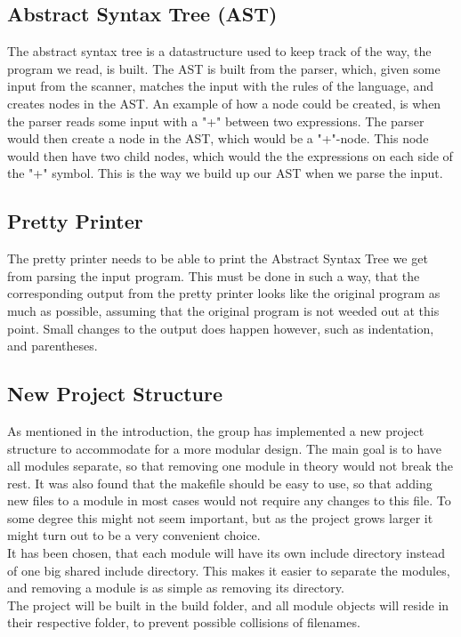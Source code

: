\documentclass[a4paper,10pt,titlepage]{report}
\begin{document}
\subsection{Abstract Syntax Tree (AST)}
The abstract syntax tree is a datastructure used to keep track of the way, the program we read, is built. The AST is built from the parser, which, given some input from the scanner, matches the input with the rules of the language, and creates nodes in the AST. An example of how a node could be created, is when the parser reads some input with a "+" between two expressions. The parser would then create a node in the AST, which would be a "+"-node. This node would then have two child nodes, which would the the expressions on each side of the "+" symbol. This is the way we build up our AST when we parse the input.

\subsection{Pretty Printer}
The pretty printer needs to be able to print the Abstract Syntax Tree we get from parsing the input program. This must be done in such a way, that the corresponding output from the pretty printer looks like the original program as much as possible, assuming that the original program is not weeded out at this point. Small changes to the output does happen however, such as indentation, and parentheses.

\subsection{New Project Structure}
As mentioned in the introduction, the group has implemented a new project structure to accommodate for a more modular design. The main goal is to have all modules separate, so that removing one module in theory would not break the rest. It was also found that the makefile should be easy to use, so that adding new files to a module in most cases would not require any changes to this file. To some degree this might not seem important, but as the project grows larger it might turn out to be a very convenient choice.\\
\vspace{6px}
It has been chosen, that each module will have its own include directory instead of one big shared include directory. This makes it easier to separate the modules, and removing a module is as simple as removing its directory.\\
\vspace{6px}
The project will be built in the build folder, and all module objects will reside in their respective folder, to prevent possible collisions of filenames.
\end{document}
